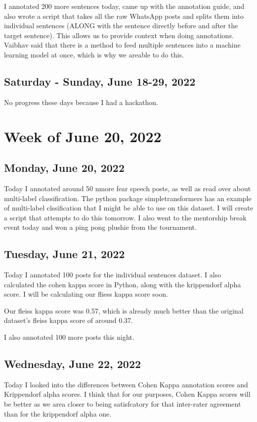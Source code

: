 \documentclass[11pt,letterpaper]{article}
\begin{document}
I annotated 200 more sentences today, came up with the annotation guide, and also wrote a script that takes all the raw WhatsApp posts and splits them into individual sentences (ALONG with the sentence directly before and after the target sentence). This allows us to provide context when doing annotations. Vaibhav said that there is a method to feed multiple sentences into a machine learning model at once, which is why we areable to do this.

\subsection{Saturday - Sunday, June 18-29, 2022}
No progress these days because I had a hackathon.

\section{Week of June 20, 2022}
\subsection{Monday, June 20, 2022}
Today I annotated around 50 nmore fear speech posts, as well as read over about multi-label classification. The python package simpletransformers has an example of multi-label clssification that I might be able to use on this dataset. I will create a script that attempts to do this tomorrow. I also went to the mentorship break event today and won a ping pong plushie from the tournament.

\subsection{Tuesday, June 21, 2022}
Today I annotated 100 posts for the individual sentences dataset. I also calculated the cohen kappa score in Python, along with the krippendorf alpha score. I will be calculating our fliess kappa score soon.

Our fleiss kappa score was 0.57, which is already much better than the original dataset's fleiss kappa score of around 0.37.

I also annotated 100 more posts this night.

\subsection{Wednesday, June 22, 2022}
Today I looked into the differences between Cohen Kappa annotation scores and Krippendorf alpha scores. I think that for our purposes, Cohen Kappa scores will be better as we area closer to being satisfcatory for that inter-rater agreement than for the krippendorf alpha one.
\end{document}
